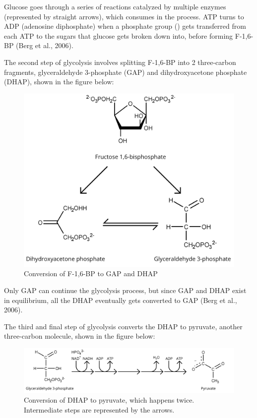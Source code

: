 \documentclass{article}
\begin{document}
Glucose goes through a series of reactions catalyzed by multiple enzymes (represented by straight arrows), which consumes  in the process. ATP turns to ADP (adenosine diphosphate) when a phosphate group () gets transferred from each ATP to the sugars that glucose gets broken down into, before forming F-1,6-BP (Berg et al., 2006).

\medskip

The second step of glycolysis involves splitting F-1,6-BP into 2 three-carbon fragments, glyceraldehyde 3-phosphate (GAP) and dihydroxyacetone phosphate (DHAP), shown in the figure below:
\begin{figure}[H]
    \centering
    \includegraphics[width=0.55\linewidth]{figures/figure_02.png}
    \caption{Conversion of F-1,6-BP to GAP and DHAP}
    \label{fig:figure2}
\end{figure}

Only GAP can continue the glycolysis process, but since GAP and DHAP exist in equilibrium, all the DHAP eventually gets converted to GAP (Berg et al., 2006).

\newpage

The third and final step of glycolysis converts the DHAP to pyruvate, another three-carbon molecule, shown in the figure below:
\begin{figure}[H]
    \centering
    \includegraphics[width=0.886\linewidth]{figures/figure_03.png}
    \caption{Conversion of DHAP to pyruvate, which happens twice. Intermediate steps are represented by the arrows.}
    \label{fig:figure3}
\end{figure}
\end{document}
